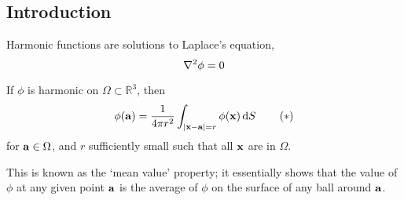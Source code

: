 \subsection{Introduction}
Harmonic functions are solutions to Laplace's equation,
\[
	\laplacian{\phi} = 0
\]
\begin{proposition}
	If \(\phi\) is harmonic on \(\Omega \subset \mathbb R^3\), then
	\begin{equation}
		\phi(\vb a) = \frac{1}{4 \pi r^2} \int_{\abs{\vb x - \vb a} = r} \phi(\vb x) \dd{S}\tag{\(\ast\)}
	\end{equation}
	for \(\vb a \in \Omega\), and \(r\) sufficiently small such that all \(\vb x\) are in \(\Omega\).
\end{proposition}
\noindent This is known as the `mean value' property; it essentially shows that the value of \(\phi\) at any given point \(\vb a\) is the average of \(\phi\) on the surface of any ball around \(\vb a\).
